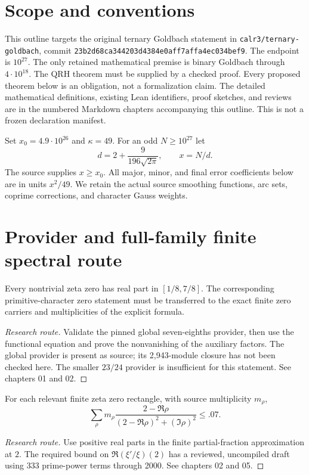 \chapter{Scope and conventions}
This outline targets the original ternary Goldbach statement in
\texttt{calr3/ternary-goldbach}, commit
\texttt{23b2d68ca344203d4384e0aff7affa4ec034bef9}.
The endpoint is $10^{27}$. The only retained mathematical premise is binary
Goldbach through $4\cdot10^{18}$. The QRH theorem must be supplied by a checked proof.
Every proposed theorem below is an obligation, not a formalization claim.
The detailed mathematical definitions, existing Lean identifiers, proof sketches,
and reviews are in the numbered Markdown chapters accompanying this outline.
This is not a frozen declaration manifest.

Set $x_0=4.9\cdot10^{26}$ and $\kappa=49$. For an odd $N\ge10^{27}$ let
\[d=2+\frac{9}{196\sqrt{2\pi}},\qquad x=N/d.\]
The source supplies $x\ge x_0$. All major, minor, and final error coefficients
below are in units $x^2/49$. We retain the actual source smoothing functions,
arc sets, coprime corrections, and character Gauss weights.

\chapter{Provider and full-family finite spectral route}
\begin{theorem}\label{strip}\notready
Every nontrivial zeta zero has real part in $[1/8,7/8]$.
The corresponding primitive-character zero statement must be transferred
to the exact finite zero carriers and multiplicities of the explicit formula.
\end{theorem}
\begin{proof}[Research route]
Validate the pinned global seven-eighths provider, then use the functional
equation and prove the nonvanishing of the auxiliary factors. The global
provider is present as source; its 2,943-module closure has not been checked here.
The smaller $23/24$ provider is insufficient for this statement.
See chapters 01 and 02.
\end{proof}

\begin{theorem}\label{mass}\notready
For each relevant finite zeta zero rectangle, with source multiplicity $m_\rho$,
\[\sum_\rho m_\rho\frac{2-\Re\rho}{(2-\Re\rho)^2+(\Im\rho)^2}\le .07.\]
\end{theorem}
\begin{proof}[Research route]
Use positive real parts in the finite partial-fraction approximation at $2$.
The required bound on $\Re(\xi'/\xi)(2)$ has a reviewed, uncompiled draft using
333 prime-power terms through 2000. See chapters 02 and 05.
\end{proof}

